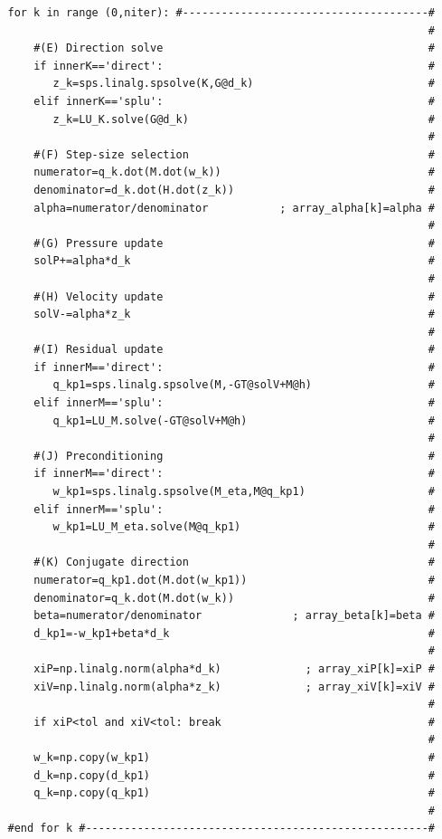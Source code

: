 \begin{lstlisting}
   for k in range (0,niter): #--------------------------------------#
                                                                    #
       #(E) Direction solve                                         #
       if innerK=='direct':                                         #
          z_k=sps.linalg.spsolve(K,G@d_k)                           #
       elif innerK=='splu':                                         #
          z_k=LU_K.solve(G@d_k)                                     #
                                                                    #
       #(F) Step-size selection                                     # 
       numerator=q_k.dot(M.dot(w_k))                                #
       denominator=d_k.dot(H.dot(z_k))                              #
       alpha=numerator/denominator           ; array_alpha[k]=alpha #
                                                                    #
       #(G) Pressure update                                         #
       solP+=alpha*d_k                                              #
                                                                    #
       #(H) Velocity update                                         #
       solV-=alpha*z_k                                              #
                                                                    #
       #(I) Residual update                                         #
       if innerM=='direct':                                         # 
          q_kp1=sps.linalg.spsolve(M,-GT@solV+M@h)                  #
       elif innerM=='splu':                                         #
          q_kp1=LU_M.solve(-GT@solV+M@h)                            #
                                                                    #
       #(J) Preconditioning                                         #
       if innerM=='direct':                                         #
          w_kp1=sps.linalg.spsolve(M_eta,M@q_kp1)                   #
       elif innerM=='splu':                                         #
          w_kp1=LU_M_eta.solve(M@q_kp1)                             #
                                                                    #
       #(K) Conjugate direction                                     #
       numerator=q_kp1.dot(M.dot(w_kp1))                            #
       denominator=q_k.dot(M.dot(w_k))                              #
       beta=numerator/denominator              ; array_beta[k]=beta #
       d_kp1=-w_kp1+beta*d_k                                        #
                                                                    #
       xiP=np.linalg.norm(alpha*d_k)             ; array_xiP[k]=xiP #
       xiV=np.linalg.norm(alpha*z_k)             ; array_xiV[k]=xiV #
                                                                    #
       if xiP<tol and xiV<tol: break                                #
                                                                    #
       w_k=np.copy(w_kp1)                                           #
       d_k=np.copy(d_kp1)                                           #
       q_k=np.copy(q_kp1)                                           #
                                                                    #
   #end for k #-----------------------------------------------------#
    

\end{lstlisting}
